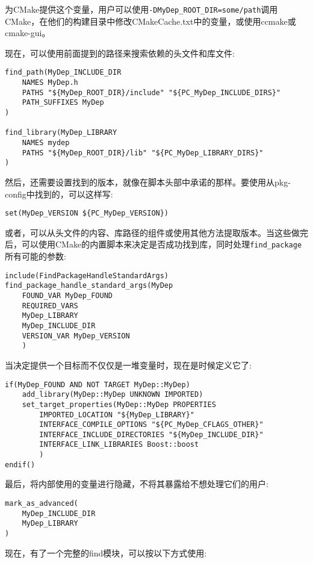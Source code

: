 为CMake提供这个变量，用户可以使用\texttt{-DMyDep\_ROOT\_DIR=some/path}调用CMake，在他们的构建目录中修改CMakeCache.txt中的变量，或使用ccmake或cmake-gui。

现在，可以使用前面提到的路径来搜索依赖的头文件和库文件:

\begin{lstlisting}[style=styleCMake]
find_path(MyDep_INCLUDE_DIR
	NAMES MyDep.h
	PATHS "${MyDep_ROOT_DIR}/include" "${PC_MyDep_INCLUDE_DIRS}"
	PATH_SUFFIXES MyDep
)

find_library(MyDep_LIBRARY
	NAMES mydep
	PATHS "${MyDep_ROOT_DIR}/lib" "${PC_MyDep_LIBRARY_DIRS}"
)
\end{lstlisting}

然后，还需要设置找到的版本，就像在脚本头部中承诺的那样。要使用从pkg-config中找到的，可以这样写:

\begin{lstlisting}[style=styleCMake]
set(MyDep_VERSION ${PC_MyDep_VERSION})
\end{lstlisting}

或者，可以从头文件的内容、库路径的组件或使用其他方法提取版本。当这些做完后，可以使用CMake的内置脚本来决定是否成功找到库，同时处理\texttt{find\_package}所有可能的参数:

\begin{lstlisting}[style=styleCMake]
include(FindPackageHandleStandardArgs)
find_package_handle_standard_args(MyDep
	FOUND_VAR MyDep_FOUND
	REQUIRED_VARS
	MyDep_LIBRARY
	MyDep_INCLUDE_DIR
	VERSION_VAR MyDep_VERSION
	)
\end{lstlisting}

当决定提供一个目标而不仅仅是一堆变量时，现在是时候定义它了:

\begin{lstlisting}[style=styleCMake]
if(MyDep_FOUND AND NOT TARGET MyDep::MyDep)
	add_library(MyDep::MyDep UNKNOWN IMPORTED)
	set_target_properties(MyDep::MyDep PROPERTIES
		IMPORTED_LOCATION "${MyDep_LIBRARY}"
		INTERFACE_COMPILE_OPTIONS "${PC_MyDep_CFLAGS_OTHER}"
		INTERFACE_INCLUDE_DIRECTORIES "${MyDep_INCLUDE_DIR}"
		INTERFACE_LINK_LIBRARIES Boost::boost
		)
endif()
\end{lstlisting}

最后，将内部使用的变量进行隐藏，不将其暴露给不想处理它们的用户:

\begin{lstlisting}[style=styleCMake]
mark_as_advanced(
	MyDep_INCLUDE_DIR
	MyDep_LIBRARY
)
\end{lstlisting}

现在，有了一个完整的find模块，可以按以下方式使用:

